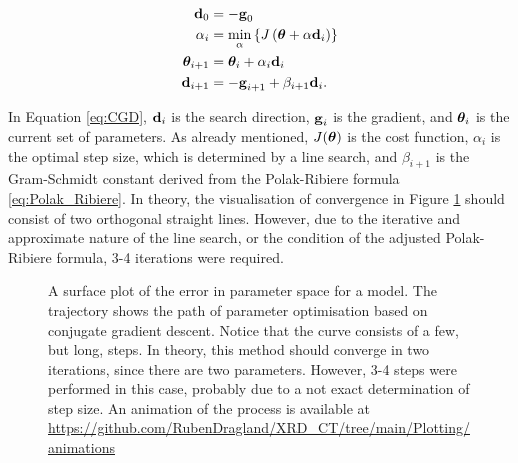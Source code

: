 \begin{align}\label{eq:CGD}
    \begin{split}
        \bm{\mathrm{d}}_{0}        & = - \bm{\mathrm{g}}_{0}                                                    \\
        \alpha_{i}        & = \min_{\alpha} \left\{  J\left(\mathrm{\boldsymbol{\theta}} + \alpha \bm{\mathrm{d}}_{i} \right) \right\} \\
        \mathrm{\boldsymbol{\theta}}_{i+1} & = \mathrm{\boldsymbol{\theta}}_{i} + \alpha_{i} \bm{\mathrm{d}}_{i}                         \\
        \bm{\mathrm{d}}_{i+1}      & = -\bm{\mathrm{g}}_{i+1} + \beta_{i+1} \bm{\mathrm{d}}_{i}.                          \\
    \end{split}
\end{align}

In Equation \eqref{eq:CGD}, $\bm{\mathrm{d}}_{i}$ is the search direction, $\bm{\mathrm{g}}_{i}$ is the gradient, and $\mathrm{\boldsymbol{\theta}}_{i}$ is the current set of parameters.
As already mentioned, $J(\mathrm{\boldsymbol{\theta}})$ is the cost function, $\alpha_{i}$ is the optimal step size, which is determined by a line search, and $\beta_{i+1}$ is the Gram-Schmidt constant derived from the Polak-Ribiere formula \eqref{eq:Polak_Ribiere}.
In theory, the visualisation of convergence in Figure \ref{fig:CGD_surface} should consist of two orthogonal straight lines.
However, due to the iterative and approximate nature of the line search, or the condition of the adjusted Polak-Ribiere formula, 3-4 iterations were required.

\begin{figure}[h!]
    \centering
    
    \caption[Trajectory of Conjugate Gradient Descent]{A surface plot of the error in parameter space for a model.
        The trajectory shows the path of parameter optimisation based on conjugate gradient descent.
        Notice that the curve consists of a few, but long, steps.
        In theory, this method should converge in two iterations, since there are two parameters.
        However, 3-4 steps were performed in this case, probably due to a not exact determination of step size.
        An animation of the process is available at \url{https://github.com/RubenDragland/XRD_CT/tree/main/Plotting/animations}
    }
    \label{fig:CGD_surface}
\end{figure}


